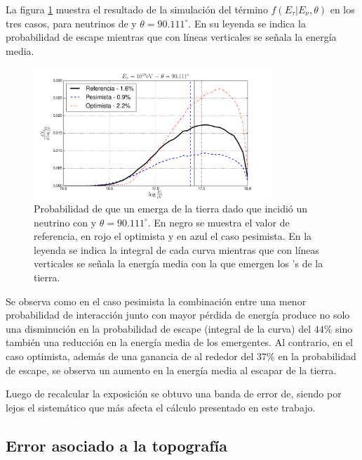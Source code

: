 	La figura \ref{fig:pdfSyst} muestra el resultado de la simulación del término $f(E_\tau|E_\nu,\theta)$ en los tres casos, para neutrinos de  y $\theta=90.111^\circ$.
	En su leyenda se indica la probabilidad de escape mientras que con líneas verticales se señala la energía media.
	\begin{figure}[ht!]
		\begin{center}
			\includegraphics[width=0.8\textwidth]{fig/resultadosAuger/pdfSyst}
			\caption{Probabilidad de que un \tauon{} emerga de la tierra dado que incidió un neutrino con  y $\theta=90.111^\circ$. En negro se muestra el valor de referencia, en rojo el optimista y en azul el caso pesimista. En la leyenda se indica la integral de cada curva mientras que con líneas verticales se señala la energía media con la que emergen los \tauon{}'s de la tierra.}
			\label{fig:pdfSyst}
		\end{center}
	\end{figure}
	Se observa como en el caso pesimista la combinación entre una menor probabilidad de interacción junto con mayor pérdida de energía produce no solo una disminución en la probabilidad de escape (integral de la curva) del $44\%$ sino también una reducción en la energía media de los \tauon{} emergentes.
	Al contrario, en el caso optimista, además de una ganancia de al rededor del $37\%$ en la probabilidad de escape, se observa un aumento en la energía media al escapar de la tierra.
	
	Luego de recalcular la exposición se obtuvo una banda de error de\linebreak {}, siendo por lejos el sistemático que más afecta el cálculo presentado en este trabajo.
	
	\subsection{Error asociado a la topografía }
	
